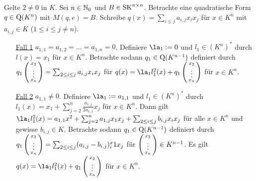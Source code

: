 \documentclass[../../main.tex]{subfiles}
\begin{document}
\begin{cproof}
	Gelte $2\neq 0$ in $K$. Sei $n\in \mathbb N_0$ und $B\in \operatorname{SK}^{n\times n}$. Betrachte eine quadratische Form $q\in \operatorname{Q}(K^n)$ mit $M(q,e)=B$. Schreibe $q(x)=\sum_{i\le j} a_{i,j}x_ix_j$ für $x\in K^n$ mit $a_{i,j}\in K$ ($1\le i\le j\ne n$).\\
	\begin{itemize}
			
		\item[\underline{Fall 1}] $a_{1,1}=a_{1,2}=\ldots =a_{1,n}=0$. Definiere $\la_1:=0$ und $l_1\in (K^n)^*$ durch $l(x)=x_1$ für $x\in K^n$. Betrachte sodann $q_1\in \operatorname{Q}(K^{n-1})$ definiert durch $q_1\left(\begin{smallmatrix}x_2\\\vdots\\x_n\end{smallmatrix}\right)=\sum_{2\le i\le j} a_{i,j}x_ix_j$ für $q(x)=\la_1l_1^2(x)+q_1\cvec{x_2\\\vdots\\x_n}$ für $x\in K^n$.\\
	
		\item[\underline{Fall 2}] $a_{1,1}\neq 0$. Definiere $\la_1:=a_{1,1}$ und $l_1\in (K^n)^*$ durch $l_1(x)=x_1+\sum_{j=2}^n\frac{a_{1,j}}{2a_{1,1}}x_j$ für $x\in K^n$. Dann gilt $\la_1l_1^2(x)=a_{1,1}x^2+\sum_{j=2}^n a_{1,j}x_1x_j+\sum_{2\le i\le j}b_{i,j}x_ix_j$ für alle $x\in K^n$ und gewisse $b_{i,j}\in K$. Betrachte sodann $q_1\in \operatorname{Q}(K^{n-1})$ definiert durch $q_1\left(\begin{smallmatrix}x_2\\\vdots\\x_n\end{smallmatrix}\right)=\sum_{2\le i\le j} (a_{i,j}-b_{i,j})^x_i1x_j$ für $\left(\begin{smallmatrix}x_2\\\vdots\\x_n\end{smallmatrix}\right)\in K^{n-1}$. Es gilt $q(x)=\la_1l_1^2(x)+q_1\cvec{x_2\\\vdots\\x_n}$ für $x\in K^n$.\\
	

\end{itemize}
\end{cproof}
\end{document}

